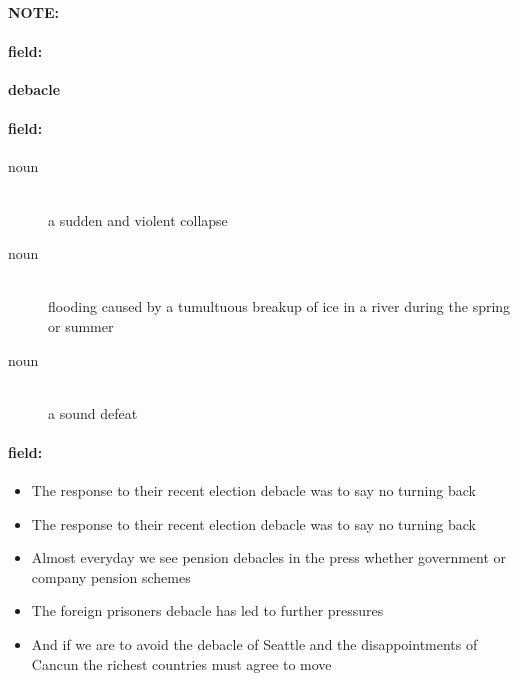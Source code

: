 \documentclass[12pt]{article}
\newenvironment{note}{\paragraph{NOTE:}}{}
\newenvironment{field}{\paragraph{field:}}{}
\begin{document}
\begin{note}
\begin{field}
\textbf{\large debacle}
\end{field}


\begin{field}
\begin{description}
\item[noun] \hfill \\ 
a sudden and violent collapse

\item[noun] \hfill \\ 
flooding caused by a tumultuous breakup of ice in a river during the spring or summer

\item[noun] \hfill \\ 
a sound defeat

\end{description}
\end{field}

\begin{field}
\begin{itemize}
\item The response to their recent election debacle was to say no turning back 
\item The response to their recent election debacle was to say no turning back 
\item Almost everyday we see pension debacles in the press whether government or company pension schemes
\item The foreign prisoners debacle has led to further pressures
\item And if we are to avoid the debacle of Seattle and the disappointments of Cancun the richest countries must agree to move
\end{itemize}
\end{field}
\end{note}
\end{document}
